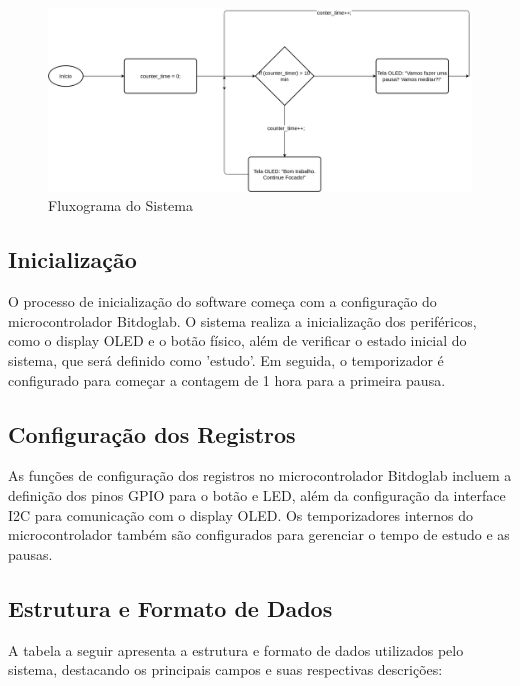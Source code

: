 \documentclass{article}
\begin{document}
\begin{figure}[htbp]
  \centering
  \includegraphics[width=\textwidth]{fig01.png}
  \caption{Fluxograma do Sistema}
  \label{fig:01}
\end{figure}


\subsection{Inicialização}
O processo de inicialização do software começa com a configuração do microcontrolador Bitdoglab. O sistema realiza a inicialização dos periféricos, como o display OLED e o botão físico, além de verificar o estado inicial do sistema, que será definido como 'estudo'. Em seguida, o temporizador é configurado para começar a contagem de 1 hora para a primeira pausa.

\subsection{Configuração dos Registros}
As funções de configuração dos registros no microcontrolador Bitdoglab incluem a definição dos pinos GPIO para o botão e LED, além da configuração da interface I2C para comunicação com o display OLED. Os temporizadores internos do microcontrolador também são configurados para gerenciar o tempo de estudo e as pausas.

\subsection{Estrutura e Formato de Dados}
A tabela a seguir apresenta a estrutura e formato de dados utilizados pelo sistema, destacando os principais campos e suas respectivas descrições:
\end{document}

